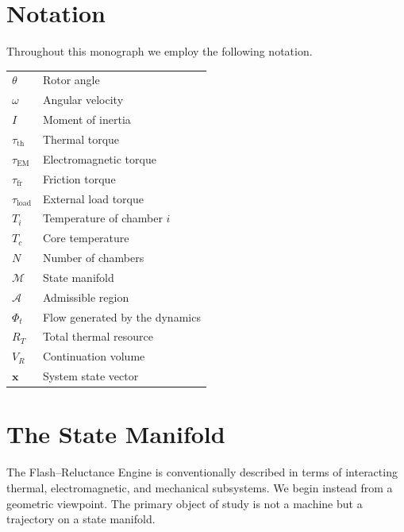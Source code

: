 \documentclass[12pt,a4paper]{article}
\begin{document}
\section*{Notation}

Throughout this monograph we employ the following notation.

\bigskip
\begin{longtable}{@{}lp{10cm}@{}}
$\theta$ & Rotor angle \\[0.4em]
$\omega$ & Angular velocity \\[0.4em]
$I$ & Moment of inertia \\[0.4em]
$\tau_{\mathrm{th}}$ & Thermal torque \\[0.4em]
$\tau_{\mathrm{EM}}$ & Electromagnetic torque \\[0.4em]
$\tau_{\mathrm{fr}}$ & Friction torque \\[0.4em]
$\tau_{\mathrm{load}}$ & External load torque \\[0.4em]
$T_i$ & Temperature of chamber $i$ \\[0.4em]
$T_c$ & Core temperature \\[0.4em]
$N$ & Number of chambers \\[0.4em]
$\mathcal{M}$ & State manifold \\[0.4em]
$\mathcal{A}$ & Admissible region \\[0.4em]
$\Phi_t$ & Flow generated by the dynamics \\[0.4em]
$R_T$ & Total thermal resource \\[0.4em]
$V_R$ & Continuation volume \\[0.4em]
$\mathbf{x}$ & System state vector \\
\end{longtable}

\newpage

\section{The State Manifold}

The Flash--Reluctance Engine is conventionally described in terms of interacting thermal, electromagnetic, and mechanical subsystems. We begin instead from a geometric viewpoint. The primary object of study is not a machine but a trajectory on a state manifold.
\end{document}
